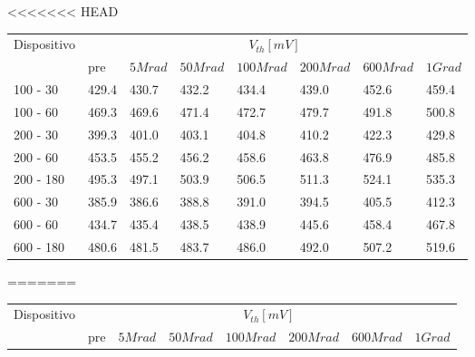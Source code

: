 \documentclass[12pt, letterpaper]{book}
\begin{document}
\begin{table}[H]
  \renewcommand{\arraystretch}{1.3}
<<<<<<< HEAD
    \begin{tabular}{m{2cm} m{0.8cm} m{1.1cm} m{1.3cm} m{1.5cm} m{1.5cm} m{1.5cm} m{1cm}}
      \toprule
      \multirow{2}{*}{Dispositivo} & \multicolumn{7}{c}{$V_{th} [mV] $}                                                                    \\
      \cmidrule{2-8}
                                   & pre                               & $5Mrad$ & $50Mrad$ & $100Mrad$ & $200Mrad$ & $600Mrad$ & $1Grad$ \\
      \midrule
      100 - 30               	& 429.4                             & 430.7   & 432.2    & 434.4     & 439.0     & 452.6     & 459.4   \\
      \hline
      100 - 60                 	& 469.3                             & 469.6   & 471.4    & 472.7     & 479.7     & 491.8     & 500.8   \\
      \hline
      200 - 30                  	& 399.3                             & 401.0   & 403.1    & 404.8     & 410.2     & 422.3     & 429.8   \\
      \hline
      200 - 60                    & 453.5                             & 455.2   & 456.2    & 458.6     & 463.8     & 476.9     & 485.8   \\
      \hline
      200 - 180 			& 495.3                             & 497.1   & 503.9    & 506.5     & 511.3     & 524.1     & 535.3   \\
      \hline
      600 - 30                  	& 385.9                             & 386.6   & 388.8    & 391.0     & 394.5     & 405.5     & 412.3   \\
      \hline
      600 - 60                    & 434.7                             & 435.4   & 438.5    & 438.9     & 445.6     & 458.4     & 467.8   \\
      \hline
      600 - 180              	& 480.6                             & 481.5   & 483.7    & 486.0     & 492.0     & 507.2     & 519.6   \\
      \bottomrule
    \end{tabular}
=======
  \begin{tabular}{m{2cm} m{0.8cm} m{1.1cm} m{1.3cm} m{1.5cm} m{1.5cm} m{1.5cm} m{1cm}}
    \toprule
    \multirow{2}{*}{Dispositivo} & \multicolumn{7}{c}{$V_{th} [mV] $}                                                                    \\
    \cmidrule{2-8}
                                 & pre                                & $5Mrad$ & $50Mrad$ & $100Mrad$ & $200Mrad$ & $600Mrad$ & $1Grad$ \\

\end{tabular}
\end{table}
\end{document}

